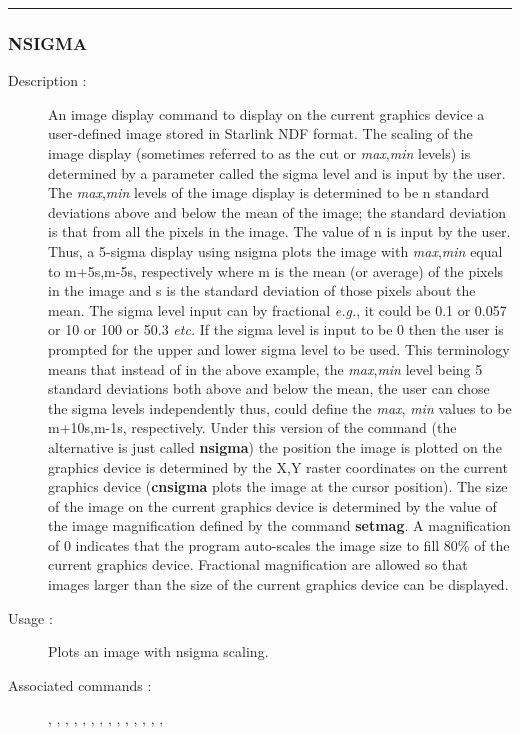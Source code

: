 \hrule 
\subsubsection*{\label{NSIGMA}NSIGMA}

\begin{description}

\item[Description :] An image display command to display on the current
graphics device a user-defined image stored in Starlink NDF format.
The scaling of the image display (sometimes referred to as the cut or
{\it max},{\it min} levels) is determined by a parameter called the
sigma level and is input by the user.  The {\it max},{\it min} levels
of the image display is determined to be n standard deviations above
and below the mean of the image; the standard deviation is that from
all the pixels in the image.  The value of n is input by the user.
Thus, a 5-sigma display using nsigma plots the image with {\it
max},{\it min} equal to m+5s,m-5s, respectively where m is the mean (or
average) of the pixels in the image and s is the standard deviation of
those pixels about the mean.  The sigma level input can by fractional
\emph{e.g.}, it could be 0.1 or 0.057 or 10 or 100 or 50.3 \emph{etc.}
If the sigma level is input to be 0 then the user is prompted for the
upper and lower sigma level to be used. This terminology means that
instead of in the above example, the {\it max},{\it min} level being 5
standard deviations both above and below the mean, the user can chose
the sigma levels independently thus, could define the {\it max},{\it
min} values to be m+10s,m-1s, respectively.  Under this version of the
command (the alternative is just called {\bf nsigma}) the position the image
is plotted on the graphics device is determined by the X,Y raster
coordinates on the current graphics device ({\bf cnsigma} plots the image at
the cursor position). The size of the image on the current graphics
device is determined by the value of the image magnification defined by
the command {\bf setmag}.  A magnification of 0 indicates that the program
auto-scales the image size to fill 80\% of the current graphics device.
Fractional magnification are allowed so that images larger than the
size of the current graphics device can be displayed.

\item[Usage :] Plots an image with nsigma scaling.

\item[Associated commands :] {\tt {}}, 
{\tt {}}, {\tt {}}, 
{\tt {}}, {\tt {}}, 
{\tt {}}, {\tt {}}, 
{\tt {}}, {\tt {}}, 
{\tt {}}, {\tt {}}, 
{\tt {}}, {\tt {}}, 
{\tt {}}, {\tt {}}


\end{description}
